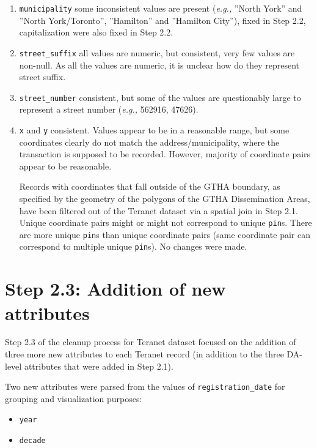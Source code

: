\documentclass[11pt]{article}
\begin{document}
\begin{enumerate}
        \item \texttt{municipality} \textemdash some inconsistent values are present (\textit{e.g.,} ''North York'' and ''North York/Toronto'', ''Hamilton'' and ''Hamilton City''), fixed in Step 2.2, capitalization were also fixed in Step 2.2.
        \item \texttt{street\_suffix} \textemdash all values are numeric, but consistent, very few values are non-null.
        As all the values are numeric, it is unclear how do they represent street suffix.
        \item \texttt{street\_number} \textemdash consistent, but some of the values are questionably large to represent a street number (\textit{e.g.,} 562916, 47626).
        \item \texttt{x} and \texttt{y} \textemdash consistent.
        Values appear to be in a reasonable range, but some coordinates clearly do not match the address/municipality, where the transaction is supposed to be recorded.
        However, majority of coordinate pairs appear to be reasonable.

        Records with coordinates that fall outside of the GTHA boundary, as specified by the geometry of the polygons of the GTHA Dissemination Areas, have been filtered out of the Teranet dataset via a spatial join in Step 2.1.
        Unique coordinate pairs might or might not correspond to unique \texttt{pin}s.
        There are more unique \texttt{pin}s than unique coordinate pairs (same coordinate pair can correspond to multiple unique \texttt{pin}s).
        No changes were made.
    \end{enumerate}

    \section{Step 2.3: Addition of new attributes} \label{sec:teranet_new_cols}

    Step 2.3 of the cleanup process for Teranet dataset focused on the addition of three more new attributes to each Teranet record (in addition to the three DA-level attributes that were added in Step 2.1).

    \vspace{5mm}

    Two new attributes were parsed from the values of \texttt{registration\_date} for grouping and visualization purposes:
    \begin{itemize}
        \item \texttt{year}
        \item \texttt{decade}
    \end{itemize}
\end{document}
